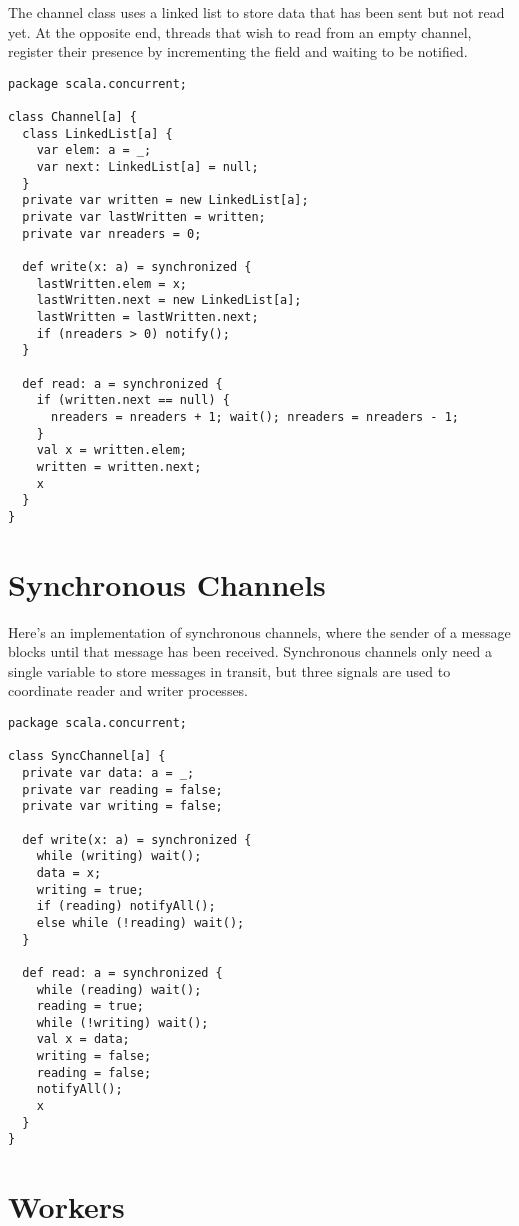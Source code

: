 {The channel class uses a linked list to store data that has been sent
but not read yet. At the opposite end, threads that
wish to read from an empty channel, register their presence by
incrementing the  field and waiting to be notified.
\begin{lstlisting}
package scala.concurrent;

class Channel[a] {
  class LinkedList[a] {
    var elem: a = _;
    var next: LinkedList[a] = null;
  }
  private var written = new LinkedList[a];
  private var lastWritten = written;
  private var nreaders = 0;

  def write(x: a) = synchronized {
    lastWritten.elem = x;
    lastWritten.next = new LinkedList[a];
    lastWritten = lastWritten.next;
    if (nreaders > 0) notify();
  }

  def read: a = synchronized {
    if (written.next == null) {
      nreaders = nreaders + 1; wait(); nreaders = nreaders - 1;
    }
    val x = written.elem;
    written = written.next;
    x
  }
}
\end{lstlisting}

\section{Synchronous Channels}

Here's an implementation of synchronous channels, where the sender of
a message blocks until that message has been received. Synchronous
channels only need a single variable to store messages in transit, but
three signals are used to coordinate reader and writer processes.
\begin{lstlisting}
package scala.concurrent;

class SyncChannel[a] {
  private var data: a = _;
  private var reading = false;
  private var writing = false;

  def write(x: a) = synchronized {
    while (writing) wait();
    data = x;
    writing = true;
    if (reading) notifyAll();
    else while (!reading) wait();
  }

  def read: a = synchronized {
    while (reading) wait();
    reading = true;
    while (!writing) wait();
    val x = data;
    writing = false;
    reading = false;
    notifyAll();
    x
  }
}
\end{lstlisting}

\section{Workers}

}
